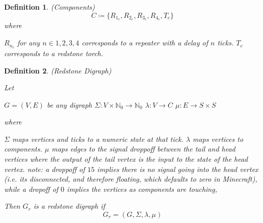 \documentclass{article}
\newtheorem{defn}{Definition}[section]
\begin{document}
\medskip

\begin{defn} (Components)
	\label{defn:components}
	\begin{equation}
		C \coloneq \{R_{1_c}, R_{2_c}, R_{3_c}, R_{4_c}, T_{c}\}
	\end{equation}
	where 
	\begin{outline}
		\1 \(R_{n_{c}}\) for any \(n \in {1, 2, 3, 4}\) corresponds to a repeater with a delay of \(n\) ticks.
		\1 \(T_{c}\) corresponds to a redstone torch.
	\end{outline}
\end{defn}

\pagebreak

\begin{defn} (Redstone Digraph)
	
	Let
	
	\begin{outline}
		\1 \(G = (V, E)\) be any digraph
		\1 \(\Sigma : V \times \mathbb{N}_{0} \to \mathbb{N}_{0}\)
		\1 \(\lambda : V \to C\)
		\1 \(\mu : E \to S \times S\)
	\end{outline}

	where 
	\begin{outline}
		\1 \(\Sigma\) maps vertices and ticks to a numeric state at that tick.
		\1 \(\lambda\) maps vertices to components.
		\1 \(\mu\) maps edges to the signal droppoff between the tail and head vertices where the output of the
		tail vertex is the input to the state of the head vertex.
			\2 note: a droppoff of \(15\) implies there is no signal going into the head vertex (i.e. its disconnected, 
			and therefore floating, which defaults to zero in Minecraft), while a dropoff of 
			\(0\) implies the vertices as components are touching,
	\end{outline}

	Then \(G_{r}\) is a redstone digraph if 
	\begin{equation}
	G_{r} = (G, \Sigma, \lambda, \mu)
	\end{equation}
\end{defn}

\medskip
\end{document}
